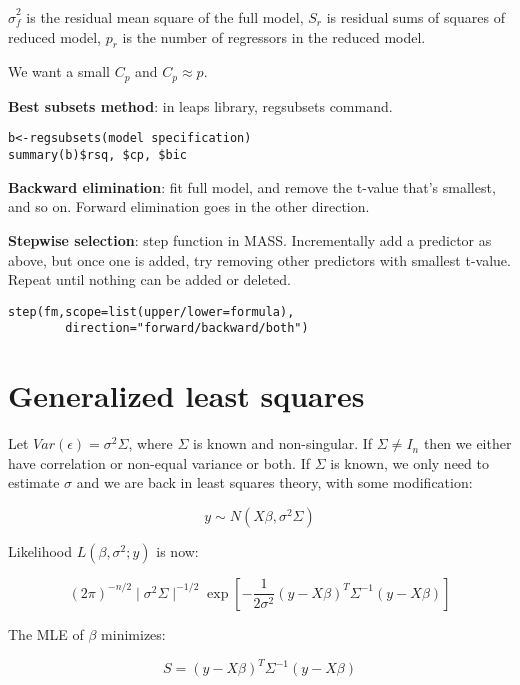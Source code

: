 $\hat{\sigma}_f^2$ is the residual mean square of the full model, $S_r$ is residual 
sums of squares of  reduced model, $p_r$ is the number of regressors in the reduced model.  

We want a small $C_p$ and $C_p \approx p$. 

\textbf{Best subsets method}: in leaps library, regsubsets command.

\begin{verbatim}
b<-regsubsets(model specification)
summary(b)$rsq, $cp, $bic
\end{verbatim}

\textbf{Backward elimination}: fit full model, and remove the t-value that's smallest, and so on.
Forward elimination goes in the other direction.

\textbf{Stepwise selection}: step function in MASS. Incrementally add a predictor as above, but once one is added, try removing other predictors with smallest t-value. Repeat until nothing can be added or deleted.

\begin{verbatim}
step(fm,scope=list(upper/lower=formula),
        direction="forward/backward/both")
\end{verbatim}

\section{Generalized least squares}

Let $Var(\epsilon)=\sigma^2 \Sigma$, where  $\Sigma$ is known and non-singular. If $\Sigma\neq I_n$ then we either have correlation or non-equal variance or both. If $\Sigma$ is known, we only need to estimate $\sigma$ and we are back in least squares theory, with some modification:

\begin{equation}
y \sim N(X\beta,\sigma^2 \Sigma)
\end{equation}

Likelihood $L(\beta,\sigma^2; y)$ is now:

\begin{equation}
 (2\pi)^{-n/2}\mid \sigma^2 \Sigma\mid^{-1/2} \exp[-\frac{1}{2\sigma^2}(y-X\beta)^T \Sigma^{-1}  (y-X\beta)]
\end{equation}

The MLE of $\beta$ minimizes:

\begin{equation}
S=(y-X\beta)^T \Sigma^{-1}  (y-X\beta)
\end{equation}

